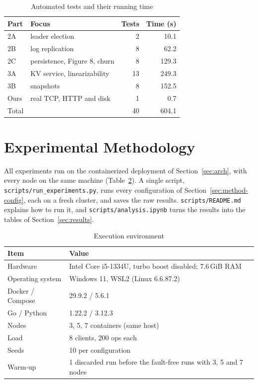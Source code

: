 \documentclass[conference]{IEEEtran}
\begin{document}
\begin{table}[h]
\centering
\small
\caption{Automated tests and their running time}
\label{tab:tests}
\setlength{\tabcolsep}{4pt}
\begin{tabular}{@{}llrr@{}}
\toprule
Part & Focus & Tests & Time (s) \\
\midrule
2A & leader election & 2 & 10.1 \\
2B & log replication & 8 & 62.2 \\
2C & persistence, Figure 8, churn & 8 & 129.3 \\
3A & KV service, linearizability & 13 & 249.3 \\
3B & snapshots & 8 & 152.5 \\
Ours & real TCP, HTTP and disk & 1 & 0.7 \\
\midrule
Total & & 40 & 604.1 \\
\bottomrule
\end{tabular}
\end{table}

\section{Experimental Methodology}\label{sec:method}
All experiments run on the containerized deployment of Section~\ref{sec:arch}, with every node on the same machine (Table~\ref{tab:env}). A single script, \texttt{scripts/run\_experiments.py},
runs every configuration of Section~\ref{sec:method-config}, each on a fresh cluster, and saves the raw results. \texttt{scripts/README.md} explains how to run it,
and \texttt{scripts/analysis.ipynb} turns the results into the tables of Section~\ref{sec:results}.

\begin{table}[h]
\centering
\small
\caption{Execution environment}\label{tab:env}
\begin{tabular}{@{}lp{50mm}@{}}
\toprule
Item & Value \\
\midrule
Hardware & Intel Core i5-1334U, turbo boost disabled; 7.6\,GiB RAM \\
Operating system & Windows 11, WSL2 (Linux 6.6.87.2) \\
Docker / Compose & 29.9.2 / 5.6.1 \\
Go / Python & 1.22.2 / 3.12.3 \\
Nodes & 3, 5, 7 containers (same host) \\
Load & 8 clients, 200 ops each \\
Seeds & 10 per configuration \\
Warm-up & 1 discarded run before the fault-free runs with 3, 5 and 7 nodes \\
\bottomrule
\end{tabular}
\end{table}
\end{document}
